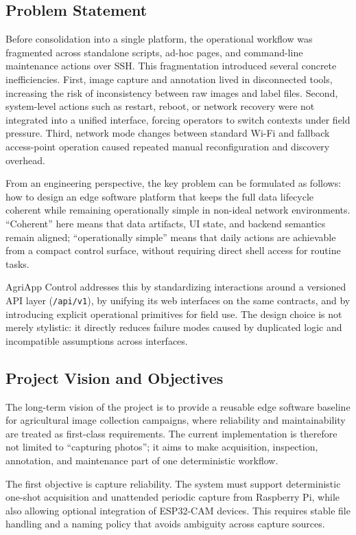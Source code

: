 \subsection{Problem Statement}
Before consolidation into a single platform, the operational workflow was fragmented across standalone scripts, ad-hoc pages, and command-line maintenance actions over SSH. This fragmentation introduced several concrete inefficiencies. First, image capture and annotation lived in disconnected tools, increasing the risk of inconsistency between raw images and label files. Second, system-level actions such as restart, reboot, or network recovery were not integrated into a unified interface, forcing operators to switch contexts under field pressure. Third, network mode changes between standard Wi-Fi and fallback access-point operation caused repeated manual reconfiguration and discovery overhead.

From an engineering perspective, the key problem can be formulated as follows: how to design an edge software platform that keeps the full data lifecycle coherent while remaining operationally simple in non-ideal network environments. ``Coherent'' here means that data artifacts, UI state, and backend semantics remain aligned; ``operationally simple'' means that daily actions are achievable from a compact control surface, without requiring direct shell access for routine tasks.

AgriApp Control addresses this by standardizing interactions around a versioned API layer (\texttt{/api/v1}), by unifying its web interfaces on the same contracts, and by introducing explicit operational primitives for field use. The design choice is not merely stylistic: it directly reduces failure modes caused by duplicated logic and incompatible assumptions across interfaces.

\subsection{Project Vision and Objectives}
The long-term vision of the project is to provide a reusable edge software baseline for agricultural image collection campaigns, where reliability and maintainability are treated as first-class requirements. The current implementation is therefore not limited to ``capturing photos''; it aims to make acquisition, inspection, annotation, and maintenance part of one deterministic workflow.

The first objective is capture reliability. The system must support deterministic one-shot acquisition and unattended periodic capture from Raspberry Pi, while also allowing optional integration of ESP32-CAM devices. This requires stable file handling and a naming policy that avoids ambiguity across capture sources.

